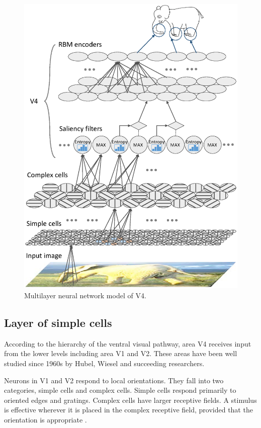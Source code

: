 \documentclass[10pt]{article}
\begin{document}
\begin{figure}
\centerline{\includegraphics[width=\linewidth]{images/fig-3.eps}} 
\caption{Multilayer neural network model of V4.}
\label{fig:3}
\end{figure}

\subsection{Layer of simple cells}

According to the hierarchy of the ventral visual pathway,
area V4 receives input from the lower levels including area V1 and V2.
These areas have been well studied since 1960s 
by Hubel, Wiesel \cite{hubel1962,hubel1965} and succeeding researchers.

Neurons in V1 and V2 respond to local orientations.
They fall into two categories, simple cells and complex cells.
Simple cells respond primarily to oriented edges and gratings.
Complex cells have larger receptive fields.
A stimulus is effective wherever it is placed in the complex receptive field, 
provided that the orientation is appropriate \cite{hubel1962}.
\end{document}
